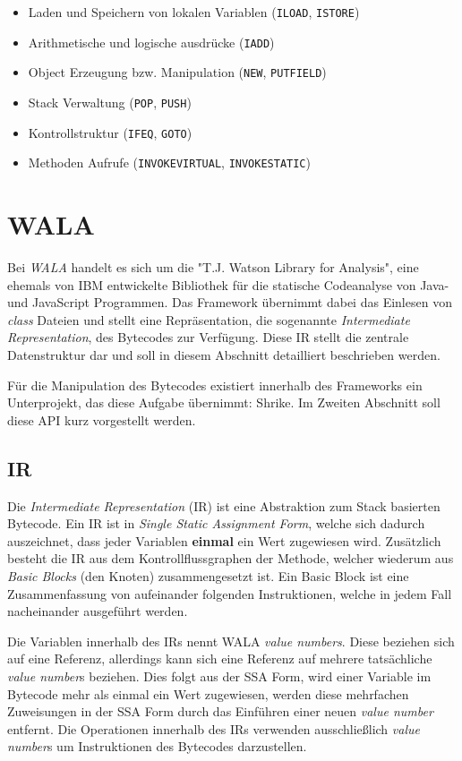 \begin{itemize}
	\item Laden und Speichern von lokalen Variablen (\texttt{ILOAD}, \texttt{ISTORE})
	\item Arithmetische und logische ausdrücke (\texttt{IADD})
	\item Object Erzeugung bzw. Manipulation (\texttt{NEW}, \texttt{PUTFIELD})
	\item Stack Verwaltung (\texttt{POP}, \texttt{PUSH}) 
	\item Kontrollstruktur (\texttt{IFEQ}, \texttt{GOTO})
	\item Methoden Aufrufe (\texttt{INVOKEVIRTUAL}, \texttt{INVOKESTATIC})
\end{itemize}  


\section{WALA}

Bei \textit{WALA} \cite{wala} handelt es sich um die "T.J. Watson Library for Analysis", eine ehemals von IBM 
entwickelte Bibliothek für die statische Codeanalyse von Java- und JavaScript Programmen. Das Framework 
übernimmt dabei das Einlesen von \textit{class} Dateien und stellt eine Repräsentation, die sogenannte 
\textit{Intermediate Representation}, des Bytecodes zur Verfügung. Diese IR stellt die zentrale 
Datenstruktur dar und soll in diesem Abschnitt detailliert beschrieben werden.

Für die Manipulation des Bytecodes existiert innerhalb des Frameworks ein Unterprojekt, das diese Aufgabe 
übernimmt: Shrike. Im Zweiten Abschnitt soll diese API kurz vorgestellt werden.  

\subsection{IR}

Die \textit{Intermediate Representation} (IR) ist eine Abstraktion zum Stack basierten Bytecode. Ein IR ist
in \textit{Single Static Assignment Form}, welche sich dadurch auszeichnet, dass jeder Variablen 
\textbf{einmal} ein Wert zugewiesen wird. Zusätzlich besteht die IR aus dem Kontrollflussgraphen der 
Methode, welcher wiederum aus \textit{Basic Blocks} (den Knoten) zusammengesetzt ist. Ein Basic Block ist eine 
Zusammenfassung von aufeinander folgenden Instruktionen, welche in jedem Fall nacheinander ausgeführt werden.

Die Variablen innerhalb des IRs nennt WALA \textit{value numbers}. Diese beziehen sich auf eine 
Referenz, allerdings kann sich eine Referenz auf mehrere tatsächliche \textit{value number}s beziehen.
Dies folgt aus der SSA Form, wird einer Variable im Bytecode mehr als einmal ein Wert zugewiesen, werden 
diese mehrfachen Zuweisungen in der SSA Form durch das Einführen einer neuen \textit{value number} entfernt. 
Die Operationen innerhalb des IRs verwenden ausschließlich \textit{value number}s um Instruktionen des Bytecodes 
darzustellen.   
 
